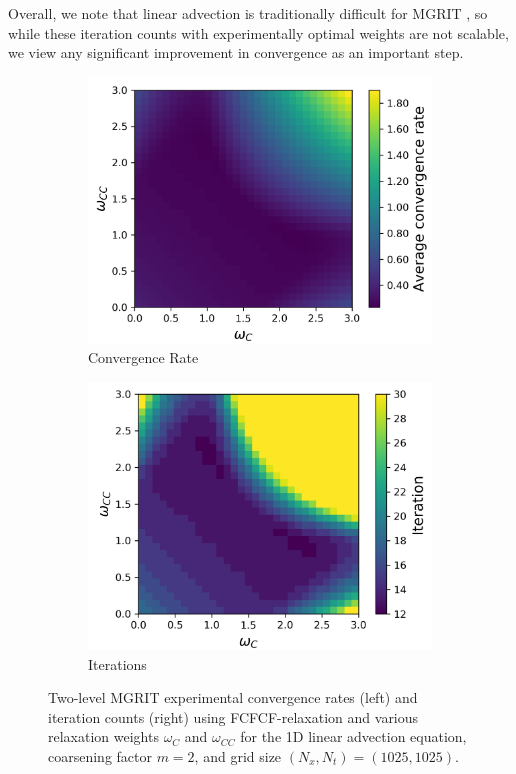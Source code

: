 \documentclass[VANCOUVER,STIX1COL]{WileyNJD-v2}
\begin{document}
Overall, we note that linear advection is traditionally difficult for MGRIT \cite{Do2016, HoDeFaMaSc2019}, so 
while these iteration counts with experimentally optimal weights are not scalable, we view any significant 
improvement in convergence as an important step.

\begin{figure}[h!]
    \centering
    \begin{subfigure}[b]{0.4\textwidth}
    \includegraphics[width=\textwidth]{images/Advc1D_C_1025_Conv.png}
    \caption{\normalsize Convergence Rate}
    \end{subfigure}
     \begin{subfigure}[b]{0.4\textwidth}
    \includegraphics[width=\textwidth]{images/Advc1D_C_1025_Iter.png}
    \caption{\normalsize Iterations}
    \end{subfigure}
    \caption{Two-level MGRIT experimental convergence rates (left) and iteration counts (right) using FCFCF-relaxation and various 
    relaxation weights $\omega_C$ and $\omega_{CC}$ for the 1D linear advection equation, coarsening factor $m=2$, and grid size $(N_x, N_t) = (1025, 1025)$.}
    \label{fig: AdvcC FCFCF-relaxation}
\end{figure}
\end{document}
